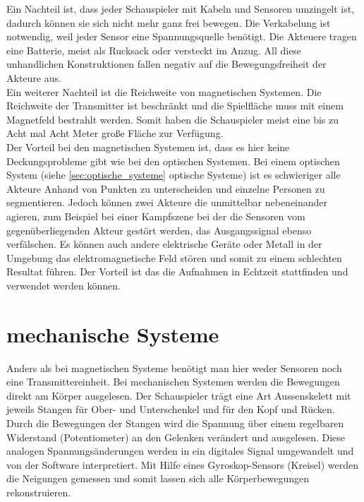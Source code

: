 Ein Nachteil ist, dass jeder Schauspieler mit Kabeln und Sensoren umzingelt ist, dadurch können sie sich nicht mehr ganz frei bewegen. Die Verkabelung ist notwendig, weil jeder Sensor eine Spannungsquelle benötigt. Die Akteuere tragen eine Batterie, meist als Rucksack oder versteckt im Anzug. All diese unhandlichen Konstruktionen fallen negativ auf die Bewegungsfreiheit der Akteure aus. \\
Ein weiterer Nachteil ist die Reichweite von magnetischen Systemen. Die Reichweite der Transmitter ist beschränkt und die Spielfläche muss mit einem Magnetfeld bestrahlt werden. Somit haben die Schauspieler meist eine bis zu Acht mal Acht Meter große Fläche zur Verfügung. \\
Der Vorteil bei den magnetischen Systemen ist, dass es hier keine Deckungsprobleme gibt wie bei den optischen Systemen. Bei einem optischen System
(siehe \ref{sec:optische_systeme} optische Systeme)
ist es schwieriger alle Akteure Anhand von Punkten zu unterscheiden und einzelne Personen zu segmentieren. 
Jedoch können zwei Akteure die unmittelbar nebeneinander agieren, zum Beispiel bei einer Kampfszene bei der die Sensoren vom gegenüberliegenden Akteur gestört werden, das Ausgangssignal ebenso verfälschen. Es können auch andere elektrische Geräte oder Metall in der Umgebung das elektromagnetische Feld stören und somit zu einem schlechten Resultat führen. Der Vorteil ist das die Aufnahmen in Echtzeit stattfinden und verwendet werden können.

\section{mechanische Systeme}

Anders als bei magnetischen Systeme benötigt man hier weder Sensoren noch eine Transmittereinheit. Bei mechanischen Systemen werden die Bewegungen direkt am Körper ausgelesen. Der Schauspieler trägt eine Art Aussenskelett mit jeweils Stangen für Ober- und Unterschenkel und für den Kopf und Rücken. Durch die Bewegungen der Stangen wird die Spannung über einem regelbaren Widerstand (Potentiometer) an den Gelenken verändert und ausgelesen. Diese analogen Spannungsänderungen werden in ein digitales Signal umgewandelt und von der Software interpretiert.
Mit Hilfe eines Gyroskop-Sensors (Kreisel) werden die Neigungen gemessen und somit lassen sich alle Körperbewegungen rekonstruieren. 

